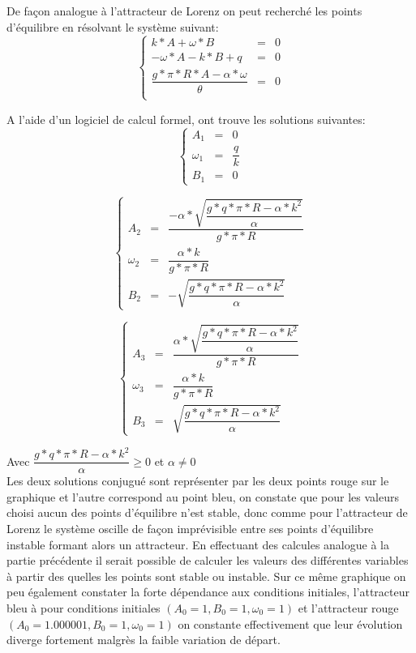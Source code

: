 De façon analogue à l'attracteur de Lorenz on peut recherché les points d'équilibre en résolvant le système suivant:
\[
    \left\{
    \begin{array}{rcl}
        k*A+\omega*B&=&0\\
        -\omega*A-k*B+q&=&0\\
        \dfrac{g*\pi*R*A-\alpha*\omega}{\theta }&=&0\\
    \end{array}
    \right.
\]

A l'aide d'un logiciel de calcul formel, ont trouve les solutions suivantes:
\[
    \left\{
    \begin{array}{rcl}
        A_1&=&0\\
        \omega_1&=&\dfrac{q}{k}\\
        B_1&=&0

    \end{array}
    \right.
\]

\[
    \left\{
    \begin{array}{rcl}
        A_2&=&\dfrac{-\alpha*\sqrt{\dfrac{g*q*\pi*R-\alpha*k^2}{\alpha}}}{g*\pi*R}\\
        \omega_2&=&\dfrac{\alpha*k}{g*\pi*R}\\
        B_2&=&-\sqrt{\dfrac{g*q*\pi*R-\alpha*k^2}{\alpha}}

    \end{array}
    \right.
\]

\[
    \left\{
    \begin{array}{rcl}
        A_3&=&\dfrac{\alpha*\sqrt{\dfrac{g*q*\pi*R-\alpha*k^2}{\alpha}}}{g*\pi*R}\\
        \omega_3&=&\dfrac{\alpha*k}{g*\pi*R}\\
        B_3&=&\sqrt{\dfrac{g*q*\pi*R-\alpha*k^2}{\alpha}}

    \end{array}
    \right.
\]

Avec $\dfrac{g*q*\pi*R-\alpha*k^2}{\alpha} \geq 0$ et $\alpha\neq 0$\\

Les deux solutions conjugué sont représenter par les deux points rouge sur le graphique et l'autre correspond au point bleu, on constate que pour les valeurs choisi aucun des points d'équilibre n'est stable, donc comme pour l'attracteur de Lorenz le système oscille de façon imprévisible entre ses points d'équilibre instable formant alors un attracteur. En effectuant des calcules analogue à la partie précédente il serait possible de calculer les valeurs des différentes variables à partir des quelles les points sont stable ou instable. 
Sur ce même graphique on peu également constater la forte dépendance aux conditions initiales, l'attracteur bleu à pour conditions initiales $(A_0=1,B_0=1,\omega_0=1)$ et l'attracteur rouge $(A_0=1.000001,B_0=1,\omega_0=1)$ on constante effectivement que leur évolution diverge fortement malgrès la faible variation de départ.


